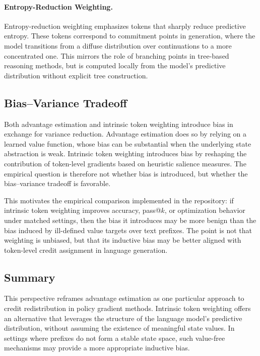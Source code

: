 \paragraph{Entropy-Reduction Weighting.}
Entropy-reduction weighting emphasizes tokens that sharply reduce predictive entropy. These tokens correspond to commitment points in generation, where the model transitions from a diffuse distribution over continuations to a more concentrated one. This mirrors the role of branching points in tree-based reasoning methods, but is computed locally from the model's predictive distribution without explicit tree construction.

\subsection{Bias--Variance Tradeoff}

Both advantage estimation and intrinsic token weighting introduce bias in exchange for variance reduction. Advantage estimation does so by relying on a learned value function, whose bias can be substantial when the underlying state abstraction is weak. Intrinsic token weighting introduces bias by reshaping the contribution of token-level gradients based on heuristic salience measures. The empirical question is therefore not whether bias is introduced, but whether the bias--variance tradeoff is favorable.

This motivates the empirical comparison implemented in the repository: if intrinsic token weighting improves accuracy, pass@$k$, or optimization behavior under matched settings, then the bias it introduces may be more benign than the bias induced by ill-defined value targets over text prefixes. The point is not that weighting is unbiased, but that its inductive bias may be better aligned with token-level credit assignment in language generation.

\subsection{Summary}

This perspective reframes advantage estimation as one particular approach to credit redistribution in policy gradient methods. Intrinsic token weighting offers an alternative that leverages the structure of the language model's predictive distribution, without assuming the existence of meaningful state values. In settings where prefixes do not form a stable state space, such value-free mechanisms may provide a more appropriate inductive bias.
